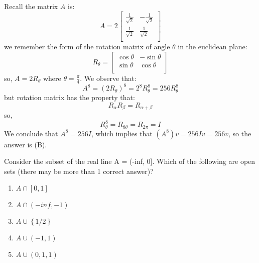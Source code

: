 \documentclass[12pt]{report}
\theoremstyle{largebreak}
\begin{document}
    \begin{sol}
        Recall the matrix $A$ is:
        \begin{equation*}
            A=2\left[
                \begin{array}{cc}
                    \frac{1}{\sqrt{2}} & -\frac{1}{\sqrt{2}} \\
                    \frac{1}{\sqrt{2}} & \frac{1}{\sqrt{2}} \\
                \end{array}
            \right]
        \end{equation*}
        we remember the form of the rotation matrix of angle $\theta$ in the euclidean plane:
        \begin{equation*}
            R_\theta=\left[
                \begin{array}{cc}
                    \cos\theta & -\sin\theta \\
                    \sin\theta & \cos\theta \\
                \end{array}
            \right]
        \end{equation*}
        so, $A=2R_\theta$ where $\theta=\frac{\pi}{4}$. We observe that:
        \begin{equation*}
            A^8=(2R_\theta)^8=2^8 R_\theta^8=256R_\theta^8
        \end{equation*}
        but rotation matrix has the property that:
        \begin{equation*}
            R_\alpha R_\beta=R_{\alpha+\beta}
        \end{equation*}
        so,
        \begin{equation*}
            R_\theta^8=R_{ 8\theta}=R_{2\pi}=I
        \end{equation*}
        We conclude that $A^8=256 I$, which implies that $(A^8)v=256Iv=256 v$, so the answer is (B).
    \end{sol}

    \begin{excer}
        Consider the subset of the real line A = (-inf, 0]. Which of the following are open sets (there may be more than 1 correct answer)?
        \begin{enumerate}[label = \textit{(\Alph*)}]
            \item $ A \cap [0,1]$
            \item $A \cap (-inf,-1)$
            \item $A \cup \left\{1/2\right\}$
            \item $A \cup (-1,1)$
            \item $A \cup (0,1,1)$
        \end{enumerate}
    \end{excer}
\end{document}
